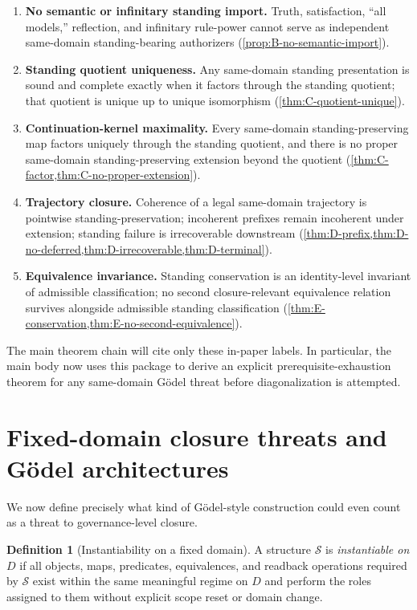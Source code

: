 \documentclass[11pt]{article}
\theoremstyle{plain}
\theoremstyle{definition}
\newtheorem{definition}[theorem]{Definition}
\newcommand{\domain}{D}
\begin{document}
\begin{enumerate}[label=\textbf{(P\arabic*)}, leftmargin=3.1em]
    \item \textbf{No semantic or infinitary standing import.} Truth, satisfaction, ``all models,'' reflection, and infinitary rule-power cannot serve as independent same-domain standing-bearing authorizers (\cref{prop:B-no-semantic-import}).

    \item \textbf{Standing quotient uniqueness.} Any same-domain standing presentation is sound and complete exactly when it factors through the standing quotient; that quotient is unique up to unique isomorphism (\cref{thm:C-quotient-unique}).

    \item \textbf{Continuation-kernel maximality.} Every same-domain standing-preserving map factors uniquely through the standing quotient, and there is no proper same-domain standing-preserving extension beyond the quotient (\cref{thm:C-factor,thm:C-no-proper-extension}).

    \item \textbf{Trajectory closure.} Coherence of a legal same-domain trajectory is pointwise standing-preservation; incoherent prefixes remain incoherent under extension; standing failure is irrecoverable downstream (\cref{thm:D-prefix,thm:D-no-deferred,thm:D-irrecoverable,thm:D-terminal}).

    \item \textbf{Equivalence invariance.} Standing conservation is an identity-level invariant of admissible classification; no second closure-relevant equivalence relation survives alongside admissible standing classification (\cref{thm:E-conservation,thm:E-no-second-equivalence}).
\end{enumerate}

The main theorem chain will cite only these in-paper labels. In particular, the main body now uses this package to derive an explicit prerequisite-exhaustion theorem for any same-domain G\"odel threat before diagonalization is attempted.

\section{Fixed-domain closure threats and G\"odel architectures}
\label{sec:threats}

We now define precisely what kind of G\"odel-style construction could even count as a threat to governance-level closure.

\begin{definition}[Instantiability on a fixed domain]
A structure $\mathcal{S}$ is \emph{instantiable on $\domain$} if all objects, maps, predicates, equivalences, and readback operations required by $\mathcal{S}$ exist within the same meaningful regime on $\domain$ and perform the roles assigned to them without explicit scope reset or domain change.
\end{definition}
\end{document}

